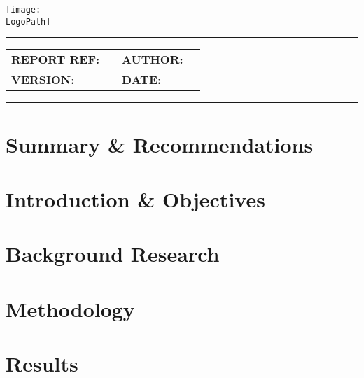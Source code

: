 \documentclass[10pt]{article}
\makeatletter
\newcommand{\customtitle}{%
  \noindent
  \begin{minipage}[t]{0.65\textwidth}
    \vspace{-0.5cm}
    {\ocrfamily\Large\bfseries \DocumentType \par}
  \end{minipage}%
  \begin{minipage}[t]{0.35\textwidth}
    \flushright{}
    \texttt{[image: \\LogoPath]}
  \end{minipage}

  \vspace{0.3cm}
  \hrule height 0.8pt
  \vspace{0.3cm}

  {\ocrfamily\bfseries\ProjectFullRef\par}
  {\ocrfamily\large\bfseries\ReportTitle\par}

  \vspace{0.5em}

  \begin{tabular}{@{}ll@{\hspace{2cm}}ll@{}}
    \ocrfamily\textbf{REPORT REF:} & \ocrfamily \ReportRef &
    \ocrfamily\textbf{AUTHOR:}     & \ocrfamily \AuthorName \\

    \ocrfamily\textbf{VERSION:}    & \ocrfamily \DocVersion &
    \ocrfamily\textbf{DATE:}       & \ocrfamily \ReleaseDate \\
  \end{tabular}

  \vspace{0.3cm}
  \hrule height 0.8pt
  \vspace{0.25cm}
}
\makeatother
\begin{document}
\vspace*{-1cm}
\thispagestyle{plain}
\customtitle{}



\section{Summary \& Recommendations}

\section{Introduction \& Objectives}

\section{Background Research}

\section{Methodology}

\section{Results}
\end{document}
